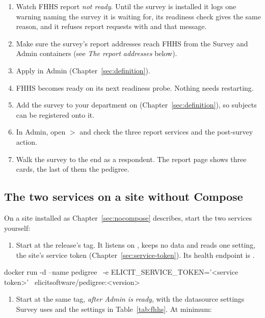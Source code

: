 \documentclass[11pt, a4paper]{article}
\begin{document}
\begin{enumerate}
  \item Watch FHHS report \emph{not ready}. Until the survey is installed it logs one warning
        naming the survey it is waiting for, its readiness check gives the same reason, and
        it refuses report requests with  and that message.
  \item Make sure the survey's report addresses reach FHHS from the Survey and Admin containers
        (see \emph{The report addresses} below).
  \item Apply  in Admin
        (Chapter~\ref{sec:definition}).
  \item FHHS becomes ready on its next readiness probe. Nothing needs restarting.
  \item Add the survey to your department on  (Chapter~\ref{sec:definition}),
        so subjects can be registered onto it.
  \item In Admin, open  $>$  and check the three report services and
        the post-survey action.
  \item Walk the survey to the end as a respondent. The report page shows three cards, the
        last of them the pedigree.
\end{enumerate}

\subsection{The two services on a site without Compose}

On a site installed as Chapter~\ref{sec:nocompose} describes, start the two services yourself:

\begin{enumerate}
  \item Start  at the release's tag. It listens on ,
        keeps no data and reads one setting, the site's service token
        (Chapter~\ref{sec:service-token}). Its health endpoint is .
\end{enumerate}

\begin{elicitcmd}[fontsize = \footnotesize]
docker run -d --name pedigree \
  -e ELICIT_SERVICE_TOKEN='<service token>' \
  elicitsoftware/pedigree:<version>
\end{elicitcmd}

\begin{enumerate}[resume]
  \item Start  at the same tag, \emph{after Admin is ready}, with the
        datasource settings Survey uses and the settings in Table~\ref{tab:fhhs}. At minimum:
\end{enumerate}
\end{document}
